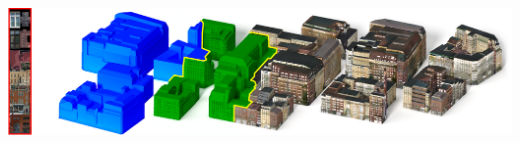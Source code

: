 \documentclass[acmtog]{acmart} %
\newcommand{\systemName}{\textsc{FrankenGAN}\xspace}
\begin{document}
%
%




%
%




\begin{teaserfigure}
  \vspace{-5pt}
  \centering
  \includegraphics[width=\textwidth]{images/teaser.pdf}
  \caption{We introduce \systemName, a method to add detail to coarse mass models.
  This method allows the user to automatically generate diverse geometry and texture detail for
   a mass model (blue), while also giving the user control over the resulting style (through exemplar images, red). Geometric details (green) and textures (right) are generated by multiple generative adversarial networks with synchronized styles. A detailed view of this model is shown in Figure~\ref{fig:london}.}
  \label{fig:teaser}
\end{teaserfigure}


\maketitle












%
\end{document}
